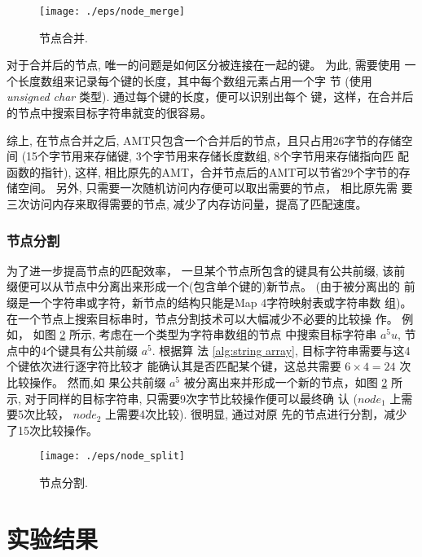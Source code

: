 \documentclass{ws-ijprai}
\begin{document}
\begin{figure}[htbp]
  \centering
  \texttt{[image: ./eps/node\_merge]}
  \caption{节点合并.}
  \label{fig:merge}
\end{figure}

对于合并后的节点, 唯一的问题是如何区分被连接在一起的键。 为此, 需要使用
一个长度数组来记录每个键的长度，其中每个数组元素占用一个字
节 (使用 \emph{unsigned char} 类型). 通过每个键的长度，便可以识别出每个
键，这样，在合并后的节点中搜索目标字符串就变的很容易。

综上, 在节点合并之后, AMT只包含一个合并后的节点，且只占用26字节的存储空
间 (15个字节用来存储键, 3个字节用来存储长度数组, 8个字节用来存储指向匹
配函数的指针), 这样, 相比原先的AMT，合并节点后的AMT可以节省29个字节的存
储空间。 另外, 只需要一次随机访问内存便可以取出需要的节点， 相比原先需
要三次访问内存来取得需要的节点, 减少了内存访问量，提高了匹配速度。


\subsubsection{节点分割}
\label{sec:node split}

为了进一步提高节点的匹配效率， 一旦某个节点所包含的键具有公共前缀, 该前
缀便可以从节点中分离出来形成一个(包含单个键的)新节点。 (由于被分离出的
前缀是一个字符串或字符，新节点的结构只能是Map 4字符映射表或字符串数
组)。 在一个节点上搜索目标串时，节点分割技术可以大幅减少不必要的比较操
作。 例如， 如图 \ref{fig:split} 所示, 考虑在一个类型为字符串数组的节点
中搜索目标字符串 $a^5u$, 节点中的4个键具有公共前缀 $a^5$. 根据算
法 \ref{alg:string array}, 目标字符串需要与这4个键依次进行逐字符比较才
能确认其是否匹配某个键，这总共需要 $6 \times 4 = 24$ 次比较操作。 然而,如
果公共前缀 $a^5$ 被分离出来并形成一个新的节点，如图 \ref{fig:split} 所
示, 对于同样的目标字符串, 只需要9次字节比较操作便可以最终确
认 ($node_1$ 上需要5次比较， $node_2$ 上需要4次比较). 很明显, 通过对原
先的节点进行分割，减少了15次比较操作。

\begin{figure}[htbp]
  \centering
  \texttt{[image: ./eps/node\_split]}
  \caption{节点分割.}
  \label{fig:split}
\end{figure}



\section{实验结果}
\label{sec:experiments}
\end{document}
